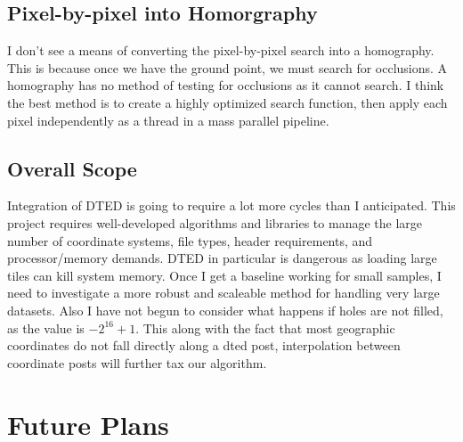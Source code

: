 \documentclass[12pt]{report}
\begin{document}
\subsection*{Pixel-by-pixel into Homorgraphy}
I don't see a means of converting the pixel-by-pixel search into a homography.  This is because
once we have the ground point, we must search for occlusions.  A homography has no method of testing 
for occlusions as it cannot search. I think the best method is to create a highly optimized search function, 
then apply each pixel independently as a thread in a mass parallel pipeline. 

\subsection*{Overall Scope}
Integration of DTED is going to require a lot more cycles than I anticipated.  This project
requires well-developed algorithms and libraries to manage the large number of coordinate systems, file types, 
header requirements, and processor/memory demands.  DTED in particular is dangerous as loading large tiles can 
kill system memory.  Once I get a baseline working for small samples, I need to investigate a more robust and scaleable method 
for handling very large datasets. Also I have not begun
to consider what happens if holes are not filled, as the value is $-2^{16}+1$. This along with the fact that most geographic coordinates
do not fall directly along a dted post, interpolation between coordinate posts will further tax our algorithm.  

\section*{Future Plans}
\end{document}
